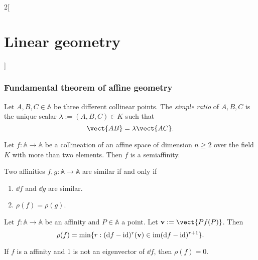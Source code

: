 \documentclass[../../../main.tex]{subfiles}
\begin{document}
\begin{multicols}{2}[\section{Linear geometry}]
  \subsubsection{Fundamental theorem of affine geometry}
  \begin{definition}
    Let $A,B,C\in\mathbb{A}$ be three different collinear points. The \emph{simple ratio} of $A,B,C$ is the unique scalar $\lambda:=(A,B,C)\in K$ such that $$\vect{AB}=\lambda\vect{AC}.$$
    \begin{theorem}
      Let $f:\mathbb{A}\rightarrow\mathbb{A}$ be a collineation of an affine space of dimension $n\geq 2$ over the field $K$ with more than two elements. Then $f$ is a semiaffinity.
    \end{theorem}
    \begin{proposition}
      Two affinities $f,g:\mathbb{A}\rightarrow\mathbb{A}$ are similar if and only if
      \begin{enumerate}
        \item $\dd{f}$ and $\dd{g}$ are similar.
        \item $\rho(f)=\rho(g)$.
      \end{enumerate}
    \end{proposition}
    \begin{theorem}
      Let $f:\mathbb{A}\rightarrow\mathbb{A}$ be an affinity and $P\in\mathbb{A}$ a point. Let $\vf{v}:=\vect{Pf(P)}$. Then $$\rho(f)=\min\{r:(\dd{f}-\mathrm{id})^r(\boldsymbol{\mathrm{v}})\in\operatorname{im}(\dd{f}-\mathrm{id})^{r+1}\}.$$
    \end{theorem}
    \begin{corollary}
      If $f$ is a affinity and 1 is not an eigenvector of $\dd{f}$, then $\rho(f)=0$.
    \end{corollary}
  \end{definition}

\end{multicols}
\end{document}
